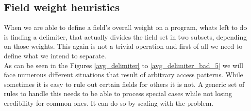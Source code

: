 \subsection{Field weight heuristics}\label{field_weight_heuristics}
When we are able to define a field's overall weight on a program, whats left to do is finding a delimiter, that actually divides the field set in two subsets, depending on those weights. This again is not a trivial operation and first of all we need to define what we intend to separate.\\
As can be seen in the Figures \ref{avg_delimiter} to \ref{avg_delimiter_bad_5} we will face numerous different situations that result of arbitrary access patterns. While sometimes it is easy to rule out certain fields for others it is not. A generic set of rules to handle this needs to be able to process special cases while not losing credibility for common ones. It can do so by scaling with the problem.
